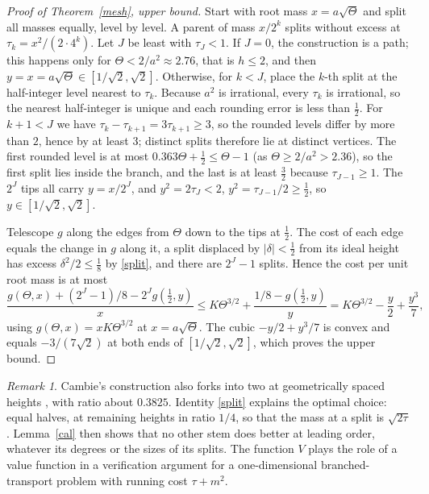 \documentclass[11pt,a4paper]{article}
\theoremstyle{remark}
\newtheorem{remark}[theorem]{Remark}
\begin{document}
\begin{proof}[Proof of Theorem~\ref{mesh}, upper bound]
Start with root mass $x=a\sqrt\Theta$ and split all masses equally, level by level. A parent of mass $x/2^k$ splits without excess at $\tau_k=x^2/(2\cdot4^k)$. Let $J$ be least with $\tau_J<1$. If $J=0$, the construction is a path; this happens only for $\Theta<2/a^2\approx2.76$, that is $h\le2$, and then $y=x=a\sqrt\Theta\in[1/\sqrt2,\sqrt2]$. Otherwise, for $k<J$, place the $k$-th split at the half-integer level nearest to $\tau_k$. Because $a^2$ is irrational, every $\tau_k$ is irrational, so the nearest half-integer is unique and each rounding error is less than $\frac12$. For $k+1<J$ we have $\tau_k-\tau_{k+1}=3\tau_{k+1}\ge3$, so the rounded levels differ by more than $2$, hence by at least $3$; distinct splits therefore lie at distinct vertices. The first rounded level is at most $0.363\Theta+\frac12\le\Theta-1$ (as $\Theta\ge2/a^2>2.36$), so the first split lies inside the branch, and the last is at least $\frac32$ because $\tau_{J-1}\ge1$. The $2^J$ tips all carry $y=x/2^J$, and $y^2=2\tau_J<2$, $y^2=\tau_{J-1}/2\ge\frac12$, so $y\in[1/\sqrt2,\sqrt2]$.

Telescope $g$ along the edges from $\Theta$ down to the tips at $\frac12$. The cost of each edge equals the change in $g$ along it, a split displaced by $|\delta|<\frac12$ from its ideal height has excess $\delta^2/2\le\frac18$ by \eqref{split}, and there are $2^J-1$ splits. Hence the cost per unit root mass is at most
\[
 \frac{g(\Theta,x)+(2^J-1)/8-2^Jg(\frac12,y)}{x}\le K\Theta^{3/2}+\frac{1/8-g(\frac12,y)}{y}
   =K\Theta^{3/2}-\frac y2+\frac{y^3}7,
\]
using $g(\Theta,x)=xK\Theta^{3/2}$ at $x=a\sqrt\Theta$. The cubic $-y/2+y^3/7$ is convex and equals $-3/(7\sqrt2)$ at both ends of $[1/\sqrt2,\sqrt2]$, which proves the upper bound.
\end{proof}

\begin{remark}\label{rem:cambie-ratio}
Cambie's construction also forks into two at geometrically spaced heights \cite[proof of Thm~3.4]{cambie}, with ratio about $0.3825$. Identity \eqref{split} explains the optimal choice: equal halves, at remaining heights in ratio $1/4$, so that the mass at a split is $\sqrt{2\tau}$. Lemma~\ref{cal} then shows that no other stem does better at leading order, whatever its degrees or the sizes of its splits. The function $V$ plays the role of a value function in a verification argument for a one-dimensional branched-transport problem with running cost $\tau+m^2$.
\end{remark}
\end{document}
